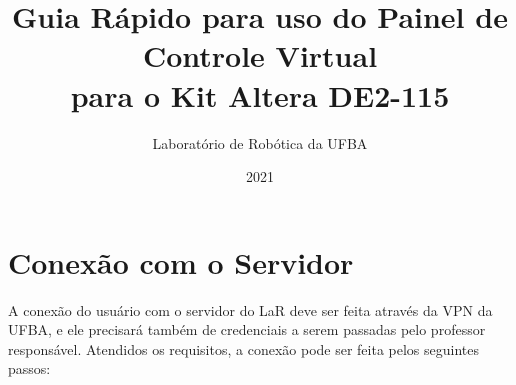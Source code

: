 \documentclass[12pt]{article}
\begin{document}
\title{Guia Rápido para uso do Painel de Controle Virtual\\
para o Kit Altera DE2-115}

\author{Laboratório de Robótica da UFBA}

\date{2021}

\maketitle

\setcounter{page}{1} %

\section{Conexão com o Servidor}
A conexão do usuário com o servidor do LaR deve ser feita através da VPN da UFBA, e ele precisará também de credenciais a serem passadas pelo professor responsável.
Atendidos os requisitos, a conexão pode ser feita pelos seguintes passos:
\end{document}
